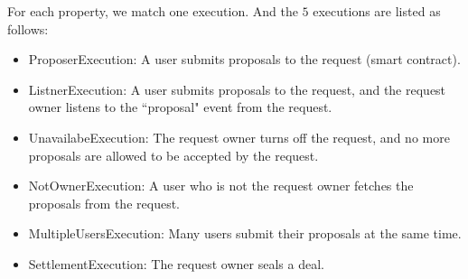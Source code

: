 \documentclass{KERauth}
\begin{document}
For each property, we match one execution.
And the $5$ executions are listed as follows:
\begin{itemize}
    \item ProposerExecution: A user submits proposals to the request (smart contract).
    \item ListnerExecution: A user submits proposals to the request, and the request owner listens to the ``proposal" event from the request.
\item UnavailabeExecution: The request owner turns off the request, and no more proposals are allowed to be accepted by the request.
\item NotOwnerExecution: A user who is not the request owner fetches the proposals from the request.
\item MultipleUsersExecution: Many users submit their proposals at the same time.
\item SettlementExecution: The request owner seals a deal.
\end{itemize}
\end{document}
